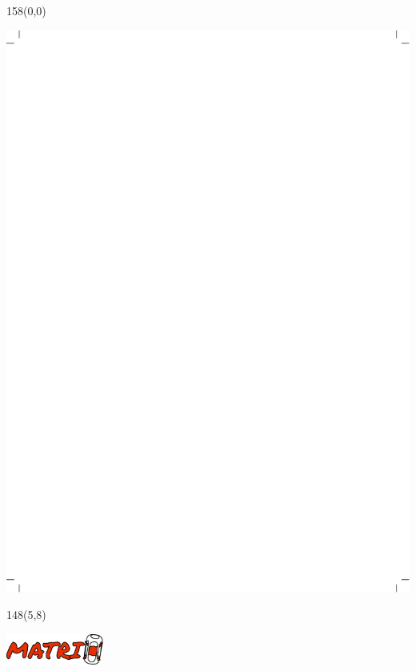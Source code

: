 \documentclass{extarticle}
\begin{document}
\pagecolor{sand}
\pagestyle{empty}

\begin{textblock}{158}(0,0)
\vfill
{\centerline{\includegraphics[scale=1,]{tools/images/notebook-background-marks-black.pdf}}} 
\vfill
\end{textblock}


\begin{textblock}{148}(5,8)
\vfill
{\centerline{\includegraphics[height=10mm,]{tools/images/logo-matrix.pdf}}}
\vfill
\end{textblock}
\end{document}
